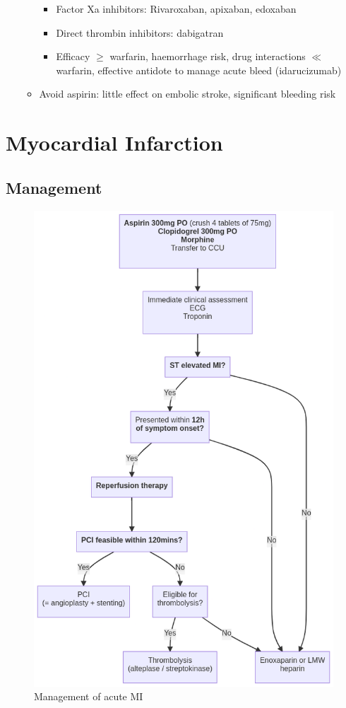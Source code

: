 \documentclass[
  12pt,
]{memoir}
\providecommand{\tightlist}{%
  \setlength{\itemsep}{0pt}\setlength{\parskip}{0pt}}
\begin{document}
\begin{itemize}
\begin{itemize}
    \begin{itemize}
    \tightlist
    \item
      Factor Xa inhibitors: Rivaroxaban, apixaban, edoxaban
    \item
      Direct thrombin inhibitors: dabigatran
    \item
      Efficacy \(\ge\) warfarin, haemorrhage risk, drug interactions
      \(\ll\) warfarin, effective antidote to manage acute bleed
      (idarucizumab)
    \end{itemize}
  \item
    Avoid aspirin: little effect on embolic stroke, significant bleeding
    risk
  \end{itemize}
\end{itemize}

\hypertarget{myocardial-infarction-1}{%
\section{Myocardial Infarction}\label{myocardial-infarction-1}}

\hypertarget{management-2}{%
\subsection{Management}\label{management-2}}

\begin{figure}
\centering
\includegraphics[width=.65\textwidth]{../assets/med/MI-mx.png}
\vspace{5mm}
\caption{Management of acute MI}
\end{figure}
\end{document}
